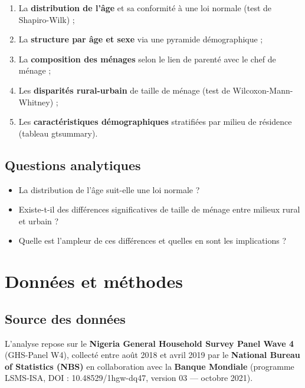 \documentclass[
  10pt,
]{article}
\providecommand{\tightlist}{%
  \setlength{\itemsep}{0pt}\setlength{\parskip}{0pt}}\usepackage{longtable,booktabs,array}
\begin{document}
\begin{enumerate}
\def\labelenumi{\arabic{enumi}.}
\tightlist
\item
  La \textbf{distribution de l'âge} et sa conformité à une loi normale
  (test de Shapiro-Wilk) ;
\item
  La \textbf{structure par âge et sexe} via une pyramide démographique ;
\item
  La \textbf{composition des ménages} selon le lien de parenté avec le
  chef de ménage ;
\item
  Les \textbf{disparités rural-urbain} de taille de ménage (test de
  Wilcoxon-Mann-Whitney) ;
\item
  Les \textbf{caractéristiques démographiques} stratifiées par milieu de
  résidence (tableau gtsummary).
\end{enumerate}

\subsection{Questions analytiques}\label{questions-analytiques}

\begin{itemize}
\tightlist
\item
  La distribution de l'âge suit-elle une loi normale ?
\item
  Existe-t-il des différences significatives de taille de ménage entre
  milieux rural et urbain ?
\item
  Quelle est l'ampleur de ces différences et quelles en sont les
  implications ?
\end{itemize}

\newpage{}

\section{Données et méthodes}\label{donnuxe9es-et-muxe9thodes}

\subsection{Source des données}\label{source-des-donnuxe9es}

L'analyse repose sur le \textbf{Nigeria General Household Survey Panel
Wave 4} (GHS-Panel W4), collecté entre août 2018 et avril 2019 par le
\textbf{National Bureau of Statistics (NBS)} en collaboration avec la
\textbf{Banque Mondiale} (programme LSMS-ISA, DOI : 10.48529/1hgw-dq47,
version 03 --- octobre 2021).
\end{document}
